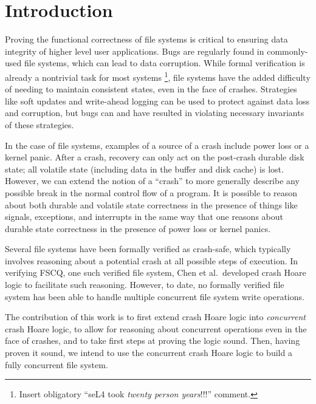 \begin{abstract}
{\it
{}
}
\end{abstract}

\section{Introduction}
Proving the functional correctness of file systems is critical to ensuring data
integrity of higher level user applications. Bugs are regularly found in
commonly-used file systems, which can lead to data
corruption.\cite{yang2006explode}
While formal verification is already a
nontrivial task for most systems
\footnote{Insert obligatory ``seL4 took
\textit{twenty person years}!!!'' comment.},
file systems have the added
difficulty of needing to maintain consistent states, even in the face of
crashes.
Strategies like soft updates and write-ahead logging can be used to
protect against data loss and corruption, but bugs can and have resulted in
violating necessary invariants of these strategies.

In the case of file systems, examples of a source of a crash include power loss
or a kernel panic.
After a crash, recovery can only act on the post-crash
durable disk state; all volatile state (including data in the buffer and disk
cache) is lost.
However, we can extend the notion of a ``crash'' to more
generally describe any possible break in the normal control flow of a program.
It is possible to reason about both durable and volatile state correctness in
the presence of things like signals, exceptions, and interrupts in the same way
that one reasons about durable state correctness in the presence of power loss
or kernel panics.

Several file systems have been formally verified as crash-safe, which typically
involves reasoning about a potential crash at all possible steps of execution.
In verifying FSCQ, one such verified file system, Chen et al.\ developed crash
Hoare logic to facilitate such reasoning\cite{chen2015using}.
However, to date,
no formally verified file system has been able to handle multiple concurrent
file system write operations.

The contribution of this work is to first extend crash Hoare logic into
\textit{concurrent} crash Hoare logic, to allow for reasoning about concurrent
operations even in the face of crashes, and to take first steps at proving the
logic sound.
Then, having proven it sound, we intend to use the concurrent
crash Hoare logic to build a fully concurrent file system.

